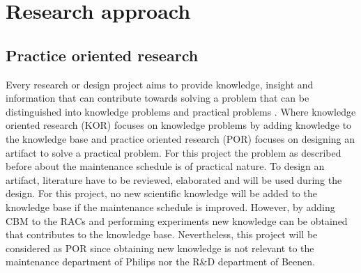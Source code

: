 \section{Research approach} \label{Research approach}
\subsection{Practice oriented research}
Every research or design project aims to provide knowledge, insight and information that can contribute towards solving a problem that can be distinguished into knowledge problems and practical problems \parencite{Verschuren2010}. Where knowledge oriented research (KOR) focuses on knowledge problems by adding knowledge to the knowledge base and practice oriented research (POR) focuses on designing an artifact to solve a practical problem. For this project the problem as described before about the maintenance schedule is of practical nature. To design an artifact, literature have to be reviewed, elaborated and will be used during the design. For this project, no new scientific knowledge will be added to the knowledge base if the maintenance schedule is improved. However, by adding CBM to the RACs and performing experiments new knowledge can be obtained that contributes to the knowledge base. Nevertheless, this project will be considered as POR since obtaining new knowledge is not relevant to the maintenance department of Philips nor the R\&D department of Beenen.

